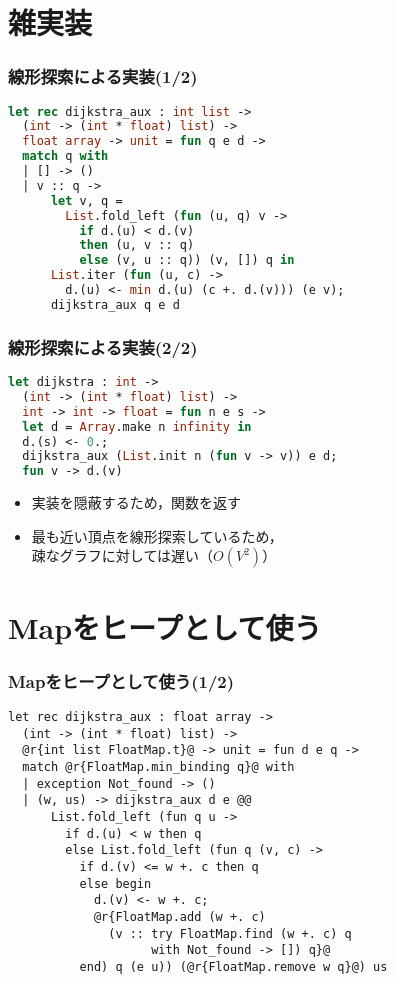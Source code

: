 \documentclass[dvipdfmx,cjk,xcolor=dvipsnames,envcountsect,notheorems,12pt]{beamer}
\theoremstyle{definition}
\begin{document}
\section{雑実装}

\begin{frame}[fragile]
	\frametitle{線形探索による実装(1/2)}
	\Large
	\begin{lstlisting}[language=Caml]
let rec dijkstra_aux : int list ->
  (int -> (int * float) list) ->
  float array -> unit = fun q e d ->
  match q with
  | [] -> ()
  | v :: q ->
      let v, q =
        List.fold_left (fun (u, q) v ->
          if d.(u) < d.(v)
          then (u, v :: q)
          else (v, u :: q)) (v, []) q in
      List.iter (fun (u, c) ->
        d.(u) <- min d.(u) (c +. d.(v))) (e v);
      dijkstra_aux q e d
\end{lstlisting}
\end{frame}

\begin{frame}[fragile]
	\frametitle{線形探索による実装(2/2)}
	\Large
	\begin{lstlisting}[language=Caml]
let dijkstra : int ->
  (int -> (int * float) list) ->
  int -> int -> float = fun n e s ->
  let d = Array.make n infinity in
  d.(s) <- 0.;
  dijkstra_aux (List.init n (fun v -> v)) e d;
  fun v -> d.(v)
\end{lstlisting}
	\begin{itemize}
		\item 実装を隠蔽するため，関数を返す
		\item 最も近い頂点を線形探索しているため，\\
			疎なグラフに対しては遅い（$O(V^2)$）
	\end{itemize}
\end{frame}

\section{Mapをヒープとして使う}

\begin{frame}[fragile]
	\frametitle{Mapをヒープとして使う(1/2)}
	\begin{lstlisting}
let rec dijkstra_aux : float array ->
  (int -> (int * float) list) ->
  @r{int list FloatMap.t}@ -> unit = fun d e q ->
  match @r{FloatMap.min_binding q}@ with
  | exception Not_found -> ()
  | (w, us) -> dijkstra_aux d e @@
      List.fold_left (fun q u ->
        if d.(u) < w then q
        else List.fold_left (fun q (v, c) ->
          if d.(v) <= w +. c then q
          else begin
            d.(v) <- w +. c;
            @r{FloatMap.add (w +. c)
              (v :: try FloatMap.find (w +. c) q
                    with Not_found -> []) q}@
          end) q (e u)) (@r{FloatMap.remove w q}@) us
\end{lstlisting}
\end{frame}
\end{document}
